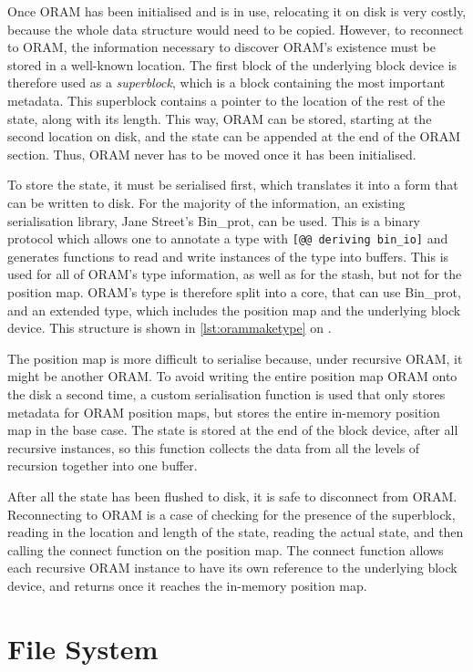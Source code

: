 \documentclass[12pt,a4paper,twoside,openright]{report}
\begin{document}
Once ORAM has been initialised and is in use, relocating it on disk is very costly, because the whole data structure would need to be copied. However, to reconnect to ORAM, the information necessary to discover ORAM's existence must be stored in a well-known location. The first block of the underlying block device is therefore used as a \emph{superblock}, which is a block containing the most important metadata. This superblock contains a pointer to the location of the rest of the state, along with its length. This way, ORAM can be stored, starting at the second location on disk, and the state can be appended at the end of the ORAM section. Thus, ORAM never has to be moved once it has been initialised.

To store the state, it must be serialised first, which translates it into a form that can be written to disk. For the majority of the information, an existing serialisation library, Jane Street's Bin\_prot, can be used. This is a binary protocol which allows one to annotate a type with \texttt{[@@ deriving bin\_io]} and generates functions to read and write instances of the type into buffers. This is used for all of ORAM's type information, as well as for the stash, but not for the position map. ORAM's type is therefore split into a core, that can use Bin\_prot, and an extended type, which includes the position map and the underlying block device. This structure is shown in \cref{lst:orammaketype} on .

The position map is more difficult to serialise because, under recursive ORAM, it might be another ORAM. To avoid writing the entire position map ORAM onto the disk a second time, a custom serialisation function is used that only stores metadata for ORAM position maps, but stores the entire in-memory position map in the base case. The state is stored at the end of the block device, after all recursive instances, so this function collects the data from all the levels of recursion together into one buffer.

After all the state has been flushed to disk, it is safe to disconnect from ORAM. Reconnecting to ORAM is a case of checking for the presence of the superblock, reading in the location and length of the state, reading the actual state, and then calling the connect function on the position map. The connect function allows each recursive ORAM instance to have its own reference to the underlying block device, and returns once it reaches the in-memory position map.

\section{File System}
\label{sec:fileSystem}
\end{document}
